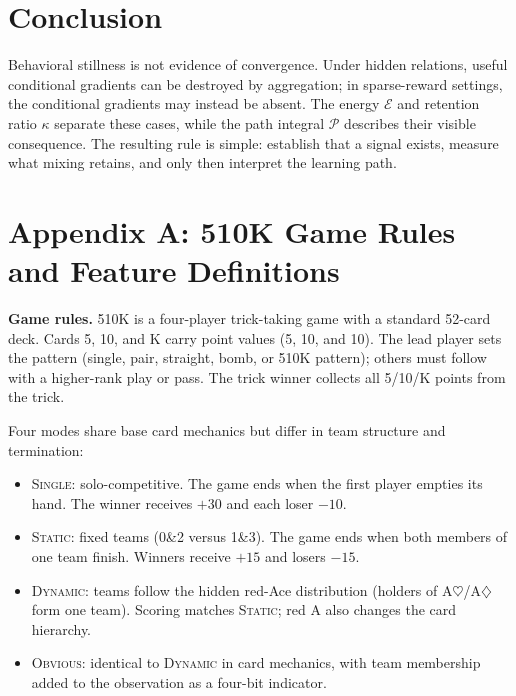 \documentclass[letterpaper]{article}
\begin{document}
\section{Conclusion}

Behavioral stillness is not evidence of convergence.
Under hidden relations, useful conditional gradients can be destroyed by aggregation; in sparse-reward settings, the conditional gradients may instead be absent.
The energy $\mathcal{E}$ and retention ratio $\kappa$ separate these cases, while the path integral $\mathcal{P}$ describes their visible consequence.
The resulting rule is simple: establish that a signal exists, measure what mixing retains, and only then interpret the learning path.


\clearpage


\clearpage
\section*{Appendix A: 510K Game Rules and Feature Definitions}

\textbf{Game rules.}
510K is a four-player trick-taking game with a standard 52-card deck.
Cards 5, 10, and K carry point values (5, 10, and 10).
The lead player sets the pattern (single, pair, straight, bomb, or 510K pattern); others must follow with a higher-rank play or pass.
The trick winner collects all 5/10/K points from the trick.

Four modes share base card mechanics but differ in team structure and termination:
\begin{itemize}
\item \textsc{Single}: solo-competitive. The game ends when the first player empties its hand. The winner receives $+30$ and each loser $-10$.
\item \textsc{Static}: fixed teams (0\&2 versus 1\&3). The game ends when both members of one team finish. Winners receive $+15$ and losers $-15$.
\item \textsc{Dynamic}: teams follow the hidden red-Ace distribution (holders of A$\heartsuit$/A$\diamondsuit$ form one team). Scoring matches \textsc{Static}; red A also changes the card hierarchy.
\item \textsc{Obvious}: identical to \textsc{Dynamic} in card mechanics, with team membership added to the observation as a four-bit indicator.
\end{itemize}
\end{document}
